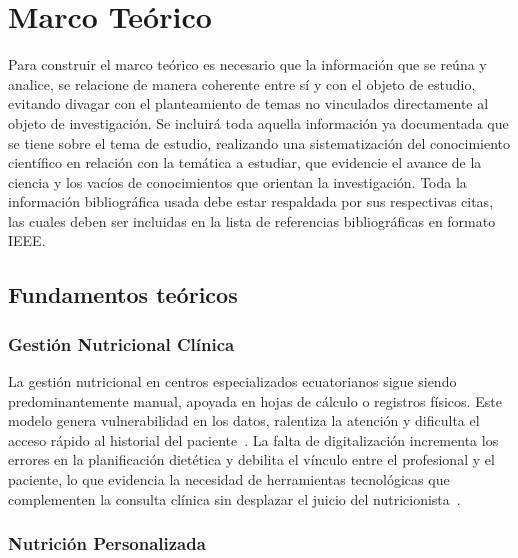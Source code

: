 \clearpage
\section{Marco Teórico}

Para construir el marco teórico es necesario que la información que se
reúna y analice, se relacione de manera coherente entre sí y con el objeto
de estudio, evitando divagar con el planteamiento de temas no vinculados
directamente al objeto de investigación. Se incluirá toda aquella
información ya documentada que se tiene sobre el tema de estudio,
realizando una sistematización del conocimiento científico en relación con
la temática a estudiar, que evidencie el avance de la ciencia y los vacíos
de conocimientos que orientan la investigación. Toda la información
bibliográfica usada debe estar respaldada por sus respectivas citas, las
cuales deben ser incluidas en la lista de referencias bibliográficas en
formato IEEE.

\subsection{Fundamentos teóricos}

\subsubsection{Gestión Nutricional Clínica}

La gestión nutricional en centros especializados ecuatorianos sigue siendo
predominantemente manual, apoyada en hojas de cálculo o registros físicos.
Este modelo genera vulnerabilidad en los datos, ralentiza la atención y
dificulta el acceso rápido al historial del paciente~\cite{quichimbo2021}.
La falta de digitalización incrementa los errores en la planificación
dietética y debilita el vínculo entre el profesional y el paciente, lo que
evidencia la necesidad de herramientas tecnológicas que complementen la
consulta clínica sin desplazar el juicio del
nutricionista~\cite{vargas2025}.

\subsubsection{Nutrición Personalizada}

